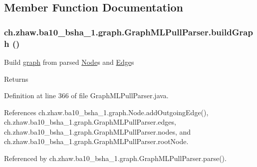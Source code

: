 \subsection{Member Function Documentation}
\hypertarget{classch_1_1zhaw_1_1ba10__bsha__1_1_1graph_1_1GraphMLPullParser_a5725aeb6453b75f4a0e7166bf4fe1023}{
\subsubsection[{buildGraph}]{ ch.zhaw.ba10\_\-bsha\_\-1.graph.GraphMLPullParser.buildGraph ()}}
\label{classch_1_1zhaw_1_1ba10__bsha__1_1_1graph_1_1GraphMLPullParser_a5725aeb6453b75f4a0e7166bf4fe1023}
Build \hyperlink{namespacech_1_1zhaw_1_1ba10__bsha__1_1_1graph}{graph} from parsed \hyperlink{classch_1_1zhaw_1_1ba10__bsha__1_1_1graph_1_1Node}{Node}s and \hyperlink{classch_1_1zhaw_1_1ba10__bsha__1_1_1graph_1_1Edge}{Edge}s

\begin{DoxyReturn}{Returns}

\end{DoxyReturn}


Definition at line 366 of file GraphMLPullParser.java.

References ch.zhaw.ba10\_\-bsha\_\-1.graph.Node.addOutgoingEdge(), ch.zhaw.ba10\_\-bsha\_\-1.graph.GraphMLPullParser.edges, ch.zhaw.ba10\_\-bsha\_\-1.graph.GraphMLPullParser.nodes, and ch.zhaw.ba10\_\-bsha\_\-1.graph.GraphMLPullParser.rootNode.

Referenced by ch.zhaw.ba10\_\-bsha\_\-1.graph.GraphMLPullParser.parse().

